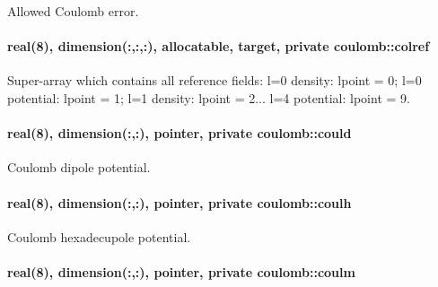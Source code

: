 Allowed Coulomb error. 

\paragraph[{\texorpdfstring{colref}{colref}}]{\setlength{\rightskip}{0pt plus 5cm}real(8), dimension(\+:,\+:,\+:), allocatable, target, private coulomb\+::colref\hspace{0.3cm}{\ttfamily [private]}}\hypertarget{namespacecoulomb_ad6d5934252662a9fb13323943cd632cf}{}\label{namespacecoulomb_ad6d5934252662a9fb13323943cd632cf}


Super-\/array which contains all reference fields\+: l=0 density\+: lpoint = 0; l=0 potential\+: lpoint = 1; l=1 density\+: lpoint = 2... l=4 potential\+: lpoint = 9. 

\paragraph[{\texorpdfstring{could}{could}}]{\setlength{\rightskip}{0pt plus 5cm}real(8), dimension(\+:,\+:), pointer, private coulomb\+::could\hspace{0.3cm}{\ttfamily [private]}}\hypertarget{namespacecoulomb_a3e49f8ac37da702af3537929c4ceec49}{}\label{namespacecoulomb_a3e49f8ac37da702af3537929c4ceec49}


Coulomb dipole potential. 

\paragraph[{\texorpdfstring{coulh}{coulh}}]{\setlength{\rightskip}{0pt plus 5cm}real(8), dimension(\+:,\+:), pointer, private coulomb\+::coulh\hspace{0.3cm}{\ttfamily [private]}}\hypertarget{namespacecoulomb_ab5865baa231f13af37435598841c083b}{}\label{namespacecoulomb_ab5865baa231f13af37435598841c083b}


Coulomb hexadecupole potential. 

\paragraph[{\texorpdfstring{coulm}{coulm}}]{\setlength{\rightskip}{0pt plus 5cm}real(8), dimension(\+:,\+:), pointer, private coulomb\+::coulm\hspace{0.3cm}{\ttfamily [private]}}\hypertarget{namespacecoulomb_ae7ca63e9c625e432df71f2f2bb337039}{}\label{namespacecoulomb_ae7ca63e9c625e432df71f2f2bb337039}


